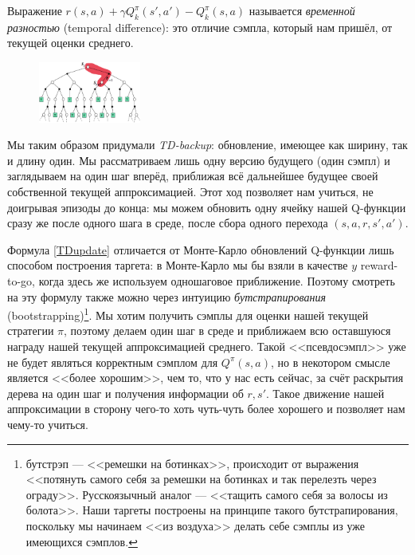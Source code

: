 Выражение $r(s, a) + \gamma Q^\pi_k(s', a') - Q^\pi_k(s, a)$ называется \emph{временной разностью} (temporal difference): это отличие сэмпла, который нам пришёл, от текущей оценки среднего.

\begin{figure}
\centering
\includegraphics[width=0.3\textwidth]{Images/TD_backup.png}
\end{figure}

Мы таким образом придумали \emph{TD-backup}: обновление, имеющее как ширину, так и длину один. Мы рассматриваем лишь одну версию будущего (один сэмпл) и заглядываем на один шаг вперёд, приближая всё дальнейшее будущее своей собственной текущей аппроксимацией. Этот ход позволяет нам учиться, не доигрывая эпизоды до конца: мы можем обновить одну ячейку нашей Q-функции сразу же после одного шага в среде, после сбора одного перехода $(s, a, r, s', a')$.

Формула \eqref{TDupdate} отличается от Монте-Карло обновлений Q-функции лишь способом построения таргета: в Монте-Карло мы бы взяли в качестве $y$ reward-to-go, когда здесь же используем одношаговое приближение. Поэтому смотреть на эту формулу также можно через интуицию \emph{бутстрапирования} (bootstrapping)\footnote{бутстрэп --- <<ремешки на ботинках>>, происходит от выражения <<потянуть самого себя за ремешки на ботинках и так перелезть через ограду>>. Русскоязычный аналог --- <<тащить самого себя за волосы из болота>>. Наши таргеты построены на принципе такого бутстрапирования, поскольку мы начинаем <<из воздуха>> делать себе сэмплы из уже имеющихся сэмплов.}. Мы хотим получить сэмплы для оценки нашей текущей стратегии $\pi$, поэтому делаем один шаг в среде и приближаем всю оставшуюся награду нашей текущей аппроксимацией среднего. Такой <<псевдосэмпл>> уже не будет являться корректным сэмплом для $Q^{\pi}(s, a)$, но в некотором смысле является <<более хорошим>>, чем то, что у нас есть сейчас, за счёт раскрытия дерева на один шаг и получения информации об $r, s'$. Такое движение нашей аппроксимации в сторону чего-то хоть чуть-чуть более хорошего и позволяет нам чему-то учиться.

